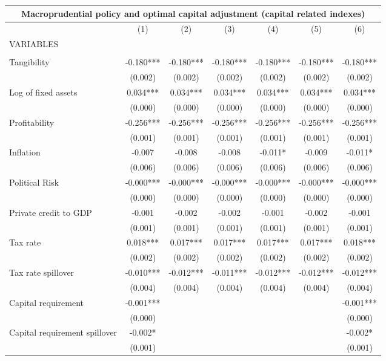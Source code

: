 \begin{tabular}{lcccccc}
\multicolumn{7}{c}{Macroprudential policy and optimal capital adjustment (capital related indexes)} \\ \hline
 & (1) & (2) & (3) & (4) & (5) & (6) \\
VARIABLES &  &  &  &  &  &  \\ \hline
 &  &  &  &  &  &  \\
Tangibility & -0.180*** & -0.180*** & -0.180*** & -0.180*** & -0.180*** & -0.180*** \\
 & (0.002) & (0.002) & (0.002) & (0.002) & (0.002) & (0.002) \\
Log of fixed assets & 0.034*** & 0.034*** & 0.034*** & 0.034*** & 0.034*** & 0.034*** \\
 & (0.000) & (0.000) & (0.000) & (0.000) & (0.000) & (0.000) \\
Profitability & -0.256*** & -0.256*** & -0.256*** & -0.256*** & -0.256*** & -0.256*** \\
 & (0.001) & (0.001) & (0.001) & (0.001) & (0.001) & (0.001) \\
Inflation & -0.007 & -0.008 & -0.008 & -0.011* & -0.009 & -0.011* \\
 & (0.006) & (0.006) & (0.006) & (0.006) & (0.006) & (0.006) \\
Political Risk & -0.000*** & -0.000*** & -0.000*** & -0.000*** & -0.000*** & -0.000*** \\
 & (0.000) & (0.000) & (0.000) & (0.000) & (0.000) & (0.000) \\
Private credit to GDP & -0.001 & -0.002 & -0.002 & -0.001 & -0.002 & -0.001 \\
 & (0.001) & (0.001) & (0.001) & (0.001) & (0.001) & (0.001) \\
Tax rate & 0.018*** & 0.017*** & 0.017*** & 0.017*** & 0.017*** & 0.018*** \\
 & (0.002) & (0.002) & (0.002) & (0.002) & (0.002) & (0.002) \\
Tax rate spillover & -0.010*** & -0.012*** & -0.011*** & -0.012*** & -0.012*** & -0.012*** \\
 & (0.004) & (0.004) & (0.004) & (0.004) & (0.004) & (0.004) \\
Capital requirement & -0.001*** &  &  &  &  & -0.001*** \\
 & (0.000) &  &  &  &  & (0.000) \\
Capital requirement spillover & -0.002* &  &  &  &  & -0.002* \\
 & (0.001) &  &  &  &  & (0.001) \\

\end{tabular}
